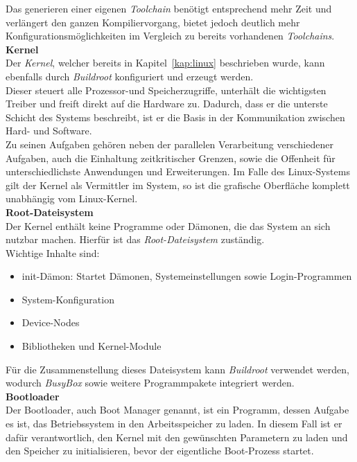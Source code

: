 Das generieren einer eigenen \emph{Toolchain} benötigt entsprechend mehr Zeit und verlängert den ganzen Kompiliervorgang, bietet jedoch deutlich mehr Konfigurationsmöglichkeiten
im Vergleich zu bereits vorhandenen \emph{Toolchains}.\\

\textbf{Kernel}\\

Der \emph{Kernel}, welcher bereits in Kapitel~\ref{kap:linux} beschrieben wurde, kann ebenfalls durch \emph{Buildroot} konfiguriert und erzeugt werden.\\
Dieser steuert alle Prozessor-und Speicherzugriffe, unterhält die wichtigsten Treiber und freift direkt auf die Hardware zu. Dadurch, dass er die unterste Schicht des Systems beschreibt,
ist er die Basis in der Kommunikation zwischen Hard- und Software.\\
Zu seinen Aufgaben gehören neben der parallelen Verarbeitung verschiedener Aufgaben, auch die Einhaltung zeitkritischer Grenzen, sowie die Offenheit für unterschiedlichste Anwendungen
und Erweiterungen. Im Falle des Linux-Systems gilt der Kernel als Vermittler im System, so ist die grafische Oberfläche komplett unabhängig vom Linux-Kernel.\cite{datacenter}\\

\textbf{Root-Dateisystem}\\

Der Kernel enthält keine Programme oder Dämonen, die das System an sich nutzbar machen. Hierfür ist das \emph{Root-Dateisystem} zuständig.\\
Wichtige Inhalte sind:
\begin{itemize}
  \item init-Dämon: Startet Dämonen, Systemeinstellungen sowie Login-Programmen
  \item System-Konfiguration
  \item Device-Nodes
  \item Bibliotheken und Kernel-Module
\end{itemize}

Für die Zusammenstellung dieses Dateisystem kann \emph{Buildroot} verwendet werden, wodurch \emph{BusyBox} sowie weitere Programmpakete integriert werden.\cite{elektronikpraxis}\\

\textbf{Bootloader}\\

Der Bootloader, auch Boot Manager genannt, ist ein Programm, dessen Aufgabe es ist, das Betriebssystem in den Arbeitsspeicher zu laden. In diesem Fall ist er dafür verantwortlich,
den Kernel mit den gewünschten Parametern zu laden und den Speicher zu initialisieren, bevor der eigentliche Boot-Prozess startet.\cite{searchdatacenter}\\


